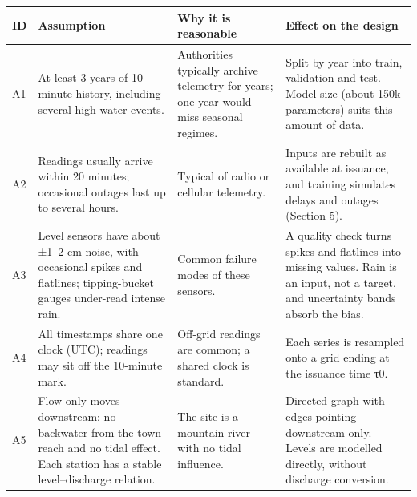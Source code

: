 \documentclass[11pt]{article}
\newcounter{none} %
\begin{document}
{\def\LTcaptype{none} %
\begin{longtable}[]{@{}
  >{\raggedright\arraybackslash}p{}
  >{\raggedright\arraybackslash}p{}
  >{\raggedright\arraybackslash}p{}
  >{\raggedright\arraybackslash}p{}@{}}
\toprule\noalign{}
\begin{minipage}[b]{\linewidth}\raggedright
ID
\end{minipage} & \begin{minipage}[b]{\linewidth}\raggedright
Assumption
\end{minipage} & \begin{minipage}[b]{\linewidth}\raggedright
Why it is reasonable
\end{minipage} & \begin{minipage}[b]{\linewidth}\raggedright
Effect on the design
\end{minipage} \\
\midrule\noalign{}
\endhead
\bottomrule\noalign{}
\endlastfoot
A1 & At least 3 years of 10-minute history, including several high-water events. & Authorities typically archive telemetry for years; one year would miss seasonal regimes. & Split by year into train, validation and test. Model size (about 150k parameters) suits this amount of data. \\
A2 & Readings usually arrive within 20 minutes; occasional outages last up to several hours. & Typical of radio or cellular telemetry. & Inputs are rebuilt as available at issuance, and training simulates delays and outages (Section 5). \\
A3 & Level sensors have about ±1--2 cm noise, with occasional spikes and flatlines; tipping-bucket gauges under-read intense rain. & Common failure modes of these sensors. & A quality check turns spikes and flatlines into missing values. Rain is an input, not a target, and uncertainty bands absorb the bias. \\
A4 & All timestamps share one clock (UTC); readings may sit off the 10-minute mark. & Off-grid readings are common; a shared clock is standard. & Each series is resampled onto a grid ending at the issuance time τ0. \\
A5 & Flow only moves downstream: no backwater from the town reach and no tidal effect. Each station has a stable level--discharge relation. & The site is a mountain river with no tidal influence. & Directed graph with edges pointing downstream only. Levels are modelled directly, without discharge conversion. \\

\end{longtable}}
\end{document}
